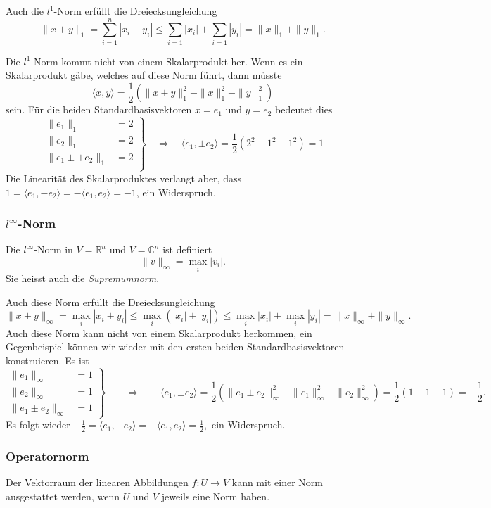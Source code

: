 Auch die $l^1$-Norm erfüllt die Dreiecksungleichung
\[
\|x+y\|_1
=
\sum_{i=1}^n |x_i+y_i|
\le 
\sum_{i=1} |x_i| + \sum_{i=1} |y_i|
=
\|x\|_1 + \|y\|_1.
\]

Die $l^1$-Norm kommt nicht von einem Skalarprodukt her.
Wenn es ein Skalarprodukt gäbe, welches auf diese Norm führt, dann
müsste 
\[
\langle x,y\rangle
=
\frac12(\|x+y\|_1^2-\|x\|_1^2-\|y\|_1^2)
\]
sein.
Für die beiden Standardbasisvektoren $x=e_1$ und $y=e_2$ 
bedeutet dies
\[
\left .
\begin{aligned}
\|e_1\|_1 &= 2\\
\|e_2\|_1 &= 2\\
\|e_1\pm +e_2\|_1 &= 2\\
\end{aligned}
\right\}
\quad\Rightarrow\quad
\langle e_1,\pm e_2\rangle
=
\frac12( 2^2 - 1^2 - 1^2) 
=1
\]
Die Linearität des Skalarproduktes verlangt aber, dass
$1=\langle e_1,-e_2\rangle = -\langle e_1,e_2\rangle = -1$,
ein Widerspruch.

\subsubsection{$l^\infty$-Norm}

\begin{definition}
Die $l^\infty$-Norm in $V=\mathbb{R}^n$ und $V=\mathbb{C}^n$ ist definiert
\[
\|v\|_\infty
=
\max_{i} |v_i|.
\]
Sie heisst auch die {\em Supremumnorm}.
%
%
\end{definition}

Auch diese Norm  erfüllt die Dreiecksungleichung
\[
\|x+y\|_\infty
=
\max_i |x_i+y_i|
\le
\max_i (|x_i| + |y_i|)
\le
\max_i |x_i| + \max_i |y_i|
=
\|x\|_\infty + \|y\|_\infty.
\]
Auch diese Norm kann nicht von einem Skalarprodukt herkommen, ein
Gegenbeispiel können wir wieder mit den ersten beiden Standardbasisvektoren
konstruieren.
Es ist
\[
\left.
\begin{aligned}
\|e_1\|_\infty &= 1\\
\|e_2\|_\infty &= 1\\
\|e_1\pm e_2\|_\infty &= 1
\end{aligned}
\right\}
\qquad\Rightarrow\qquad
\langle e_1,\pm e_2\rangle
=
\frac12(\|e_1\pm e_2\|_\infty^2 - \|e_1\|_\infty^2 - \|e_2\|_\infty^2)
=
\frac12(1-1-1) = -\frac12.
\]
Es folgt wieder
\(
-\frac12
=
\langle e_1,-e_2\rangle
=
-\langle e_1,e_2\rangle
=
\frac12,
\)
ein Widerspruch.

\subsubsection{Operatornorm}
Der Vektorraum der linearen Abbildungen $f\colon U\to V$ kann mit einer
Norm ausgestattet werden, wenn $U$ und $V$ jeweils eine Norm haben.

